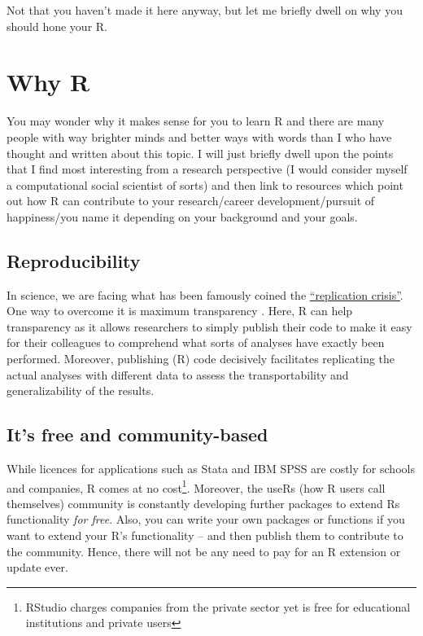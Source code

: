 \documentclass[
]{book}
\begin{document}
Not that you haven't made it here anyway, but let me briefly dwell on why you should hone your R.

\hypertarget{why-r}{%
\section{Why R}\label{why-r}}

You may wonder why it makes sense for you to learn R and there are many people with way brighter minds and better ways with words than I who have thought and written about this topic. I will just briefly dwell upon the points that I find most interesting from a research perspective (I would consider myself a computational social scientist of sorts) and then link to resources which point out how R can contribute to your research/career development/pursuit of happiness/you name it depending on your background and your goals.

\hypertarget{reproducibility}{%
\subsection{Reproducibility}\label{reproducibility}}

In science, we are facing what has been famously coined the \href{https://www.wired.com/story/social-science-reproducibility/}{``replication crisis''}. One way to overcome it is maximum transparency \citep{munafo2017}. Here, R can help transparency as it allows researchers to simply publish their code to make it easy for their colleagues to comprehend what sorts of analyses have exactly been performed. Moreover, publishing (R) code decisively facilitates replicating the actual analyses with different data to assess the transportability and generalizability of the results.

\hypertarget{its-free-and-community-based}{%
\subsection{It's free and community-based}\label{its-free-and-community-based}}

While licences for applications such as Stata and IBM SPSS are costly for schools and companies, R comes at no cost\footnote{RStudio charges companies from the private sector yet is free for educational institutions and private users}. Moreover, the useRs (how R users call themselves) community is constantly developing further packages to extend Rs functionality \emph{for free}. Also, you can write your own packages or functions if you want to extend your R's functionality -- and then publish them to contribute to the community. Hence, there will not be any need to pay for an R extension or update ever.
\end{document}
